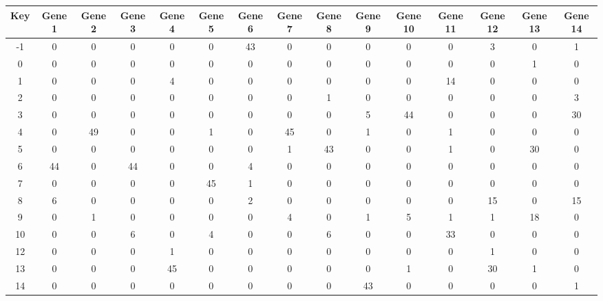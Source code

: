 \begin{tabular}{|c|c|c|c|c|c|c|c|c|c|c|c|c|c|c|}
\hline
Key & Gene 1 & Gene 2 & Gene 3 & Gene 4 & Gene 5 & Gene 6 & Gene 7 & Gene 8 & Gene 9 & Gene 10 & Gene 11 & Gene 12 & Gene 13 & Gene 14 \\
\hline
-1 & 0 & 0 & 0 & 0 & 0 & 43 & 0 & 0 & 0 & 0 & 0 & 3 & 0 & 1 \\
0 & 0 & 0 & 0 & 0 & 0 & 0 & 0 & 0 & 0 & 0 & 0 & 0 & 1 & 0 \\
1 & 0 & 0 & 0 & 4 & 0 & 0 & 0 & 0 & 0 & 0 & 14 & 0 & 0 & 0 \\
2 & 0 & 0 & 0 & 0 & 0 & 0 & 0 & 1 & 0 & 0 & 0 & 0 & 0 & 3 \\
3 & 0 & 0 & 0 & 0 & 0 & 0 & 0 & 0 & 5 & 44 & 0 & 0 & 0 & 30 \\
4 & 0 & 49 & 0 & 0 & 1 & 0 & 45 & 0 & 1 & 0 & 1 & 0 & 0 & 0 \\
5 & 0 & 0 & 0 & 0 & 0 & 0 & 1 & 43 & 0 & 0 & 1 & 0 & 30 & 0 \\
6 & 44 & 0 & 44 & 0 & 0 & 4 & 0 & 0 & 0 & 0 & 0 & 0 & 0 & 0 \\
7 & 0 & 0 & 0 & 0 & 45 & 1 & 0 & 0 & 0 & 0 & 0 & 0 & 0 & 0 \\
8 & 6 & 0 & 0 & 0 & 0 & 2 & 0 & 0 & 0 & 0 & 0 & 15 & 0 & 15 \\
9 & 0 & 1 & 0 & 0 & 0 & 0 & 4 & 0 & 1 & 5 & 1 & 1 & 18 & 0 \\
10 & 0 & 0 & 6 & 0 & 4 & 0 & 0 & 6 & 0 & 0 & 33 & 0 & 0 & 0 \\
12 & 0 & 0 & 0 & 1 & 0 & 0 & 0 & 0 & 0 & 0 & 0 & 1 & 0 & 0 \\
13 & 0 & 0 & 0 & 45 & 0 & 0 & 0 & 0 & 0 & 1 & 0 & 30 & 1 & 0 \\
14 & 0 & 0 & 0 & 0 & 0 & 0 & 0 & 0 & 43 & 0 & 0 & 0 & 0 & 1 \\
\hline
\end{tabular}